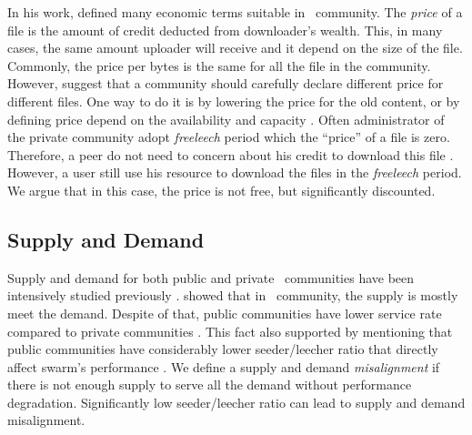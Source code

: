 In his work, \citeauthor{2012:economicbt:kash} defined many economic terms suitable in \bt~community. The \textit{price} of a file is the amount of credit deducted from downloader's wealth. This, in many cases, the same amount uploader will receive and it depend on the size of the file. Commonly, the price per bytes is the same for all the file in the community. However, \citeauthor{2012:economicbt:kash} suggest that a community should carefully declare different price for different files. One way to do it is by lowering the price for the old content, or by defining price depend on the availability and capacity \cite{2012:economicbt:kash}. Often administrator of the private community adopt \textit{freeleech} period which the ``price'' of a file is zero. Therefore, a peer do not need to concern about his credit to download this file \cite{2010:crashsustain:rahman}. However, a user still use his resource to download the files in the \textit{freeleech} period. We argue that in this case, the price is not free, but significantly discounted.

\subsection{Supply and Demand}
\label{section:suppdemand}
Supply and demand for both public and private \bt~communities have been intensively studied previously \cite{2009:demandsupplyres:andrade, 2010:pubpriv:meulpolder}. \citeauthor{2009:demandsupplyres:andrade} showed that in \bt~community, the supply is mostly meet the demand. Despite of that, public communities have lower service rate compared to private communities \cite{2009:demandsupplyres:andrade}. This fact also supported by \citeauthor{2010:pubpriv:meulpolder} mentioning that public communities have considerably lower seeder/leecher ratio that directly affect swarm's performance \cite{2010:pubpriv:meulpolder}. We define a supply and demand \textit{misalignment} if there is not enough supply to serve all the demand without performance degradation. Significantly low seeder/leecher ratio can lead to supply and demand misalignment.

